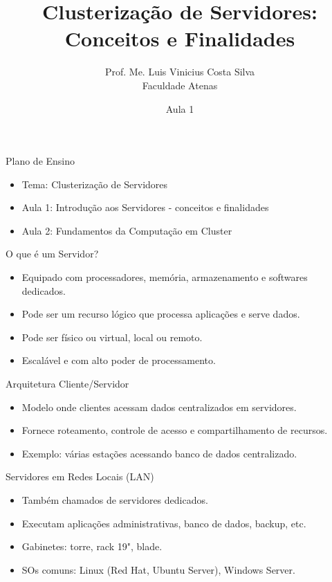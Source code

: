 \documentclass{beamer}
\title[Clusterização de Servidores]{Clusterização de Servidores: Conceitos e Finalidades}
\author[Prof. Me. Luis Vinicius Costa Silva]{Prof. Me. Luis Vinicius Costa Silva\\Faculdade Atenas}
\date{Aula 1}
\begin{document}
\frame{\titlepage}

\begin{frame}{Plano de Ensino}
\begin{itemize}
    \item Tema: Clusterização de Servidores
    \item Aula 1: Introdução aos Servidores - conceitos e finalidades
    \item Aula 2: Fundamentos da Computação em Cluster
\end{itemize}
\end{frame}

\begin{frame}{O que é um Servidor?}
\begin{itemize}
    \item Equipado com processadores, memória, armazenamento e softwares dedicados.
    \item Pode ser um recurso lógico que processa aplicações e serve dados.
    \item Pode ser físico ou virtual, local ou remoto.
    \item Escalável e com alto poder de processamento.
\end{itemize}
\end{frame}

\begin{frame}{Arquitetura Cliente/Servidor}
\begin{itemize}
    \item Modelo onde clientes acessam dados centralizados em servidores.
    \item Fornece roteamento, controle de acesso e compartilhamento de recursos.
    \item Exemplo: várias estações acessando banco de dados centralizado.
\end{itemize}
\end{frame}

\begin{frame}{Servidores em Redes Locais (LAN)}
\begin{itemize}
    \item Também chamados de servidores dedicados.
    \item Executam aplicações administrativas, banco de dados, backup, etc.
    \item Gabinetes: torre, rack 19", blade.
    \item SOs comuns: Linux (Red Hat, Ubuntu Server), Windows Server.
\end{itemize}
\end{frame}
\end{document}

